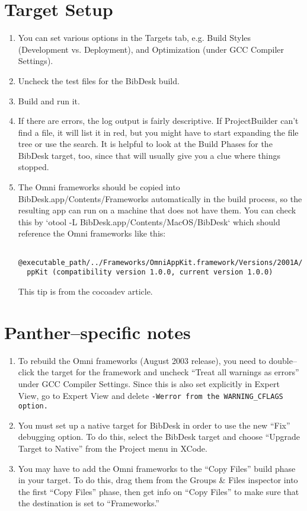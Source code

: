 \documentclass[11pt]{article}
\begin{document}
\section{Target Setup}
\begin{enumerate}
\item You can set various options in the Targets tab, e.g. Build Styles (Development vs. Deployment),
and Optimization (under GCC Compiler Settings).
\item Uncheck the test files for the BibDesk build.
\item Build and run it.
\item If there are errors, the log output is fairly descriptive.  If ProjectBuilder can't find a
file, it will list it in red, but you might have to start expanding the file tree or use the
search.  It is helpful to look at the Build Phases for the BibDesk target, too, since that will
usually give you a clue where things stopped.
\item The Omni frameworks should be copied into BibDesk.app/Contents/Frameworks automatically in the
build process, so the resulting app can run on a machine that does not have them.  You can check
this by `otool -L BibDesk.app/Contents/MacOS/BibDesk` which should reference the Omni frameworks
like this:  \begin{verbatim}
  @executable_path/../Frameworks/OmniAppKit.framework/Versions/2001A/OmniA
  ppKit (compatibility version 1.0.0, current version 1.0.0)
\end{verbatim}  This tip is from the cocoadev article.
\end{enumerate}

\section{Panther--specific notes}
\begin{enumerate}
\item To rebuild the Omni frameworks (August 2003 release), you need to double--click the
target for the framework and uncheck ``Treat all warnings as errors'' under GCC Compiler
Settings.  Since this is also set explicitly in Expert View, go to Expert View and delete
\tt{-Werror} \rm from the \tt WARNING\_CFLAGS \rm option.
\item You must set up a native target for BibDesk in order to use the new ``Fix'' debugging
option.  To do this, select the BibDesk target and choose ``Upgrade Target to Native'' from
the Project menu in XCode.
\item You may have to add the Omni frameworks to the ``Copy Files'' build phase in your
target.  To do this, drag them from the Groups \& Files inspector into the first ``Copy
Files'' phase, then get info on ``Copy Files'' to make sure that the destination is set to
``Frameworks.''
\end{enumerate}


 
\end{document}

